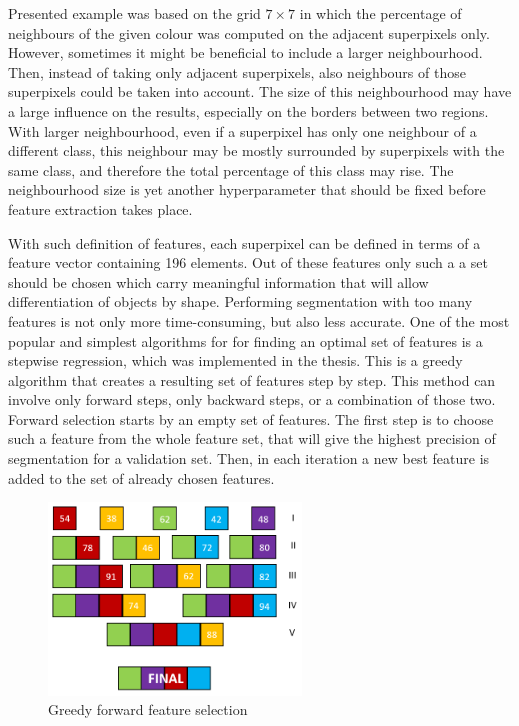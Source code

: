 Presented example was based on the grid $7 \times 7$ in which the percentage of neighbours of the given colour was computed on the adjacent superpixels only. However, sometimes it might be beneficial to include a larger neighbourhood. Then, instead of taking only adjacent superpixels, also neighbours of those superpixels could be taken into account. The size of this neighbourhood may have a large influence on the results, especially on the borders between two regions. With larger neighbourhood, even if a superpixel has only one neighbour of a different class, this neighbour may be mostly surrounded by superpixels with the same class, and therefore the total percentage of this class may rise. The neighbourhood size is yet another hyperparameter that should be fixed before feature extraction takes place.

With such definition of features, each superpixel can be defined in terms of a feature vector containing 196 elements. Out of these features only such a a set should be chosen which carry meaningful information that will allow differentiation of objects by shape. Performing segmentation with too many features is not only more time-consuming, but also less accurate. One of the most popular and simplest algorithms for for finding an optimal set of features is a stepwise regression, which was implemented in the thesis. This is a greedy algorithm that creates a resulting set of features step by step. This method can involve only forward steps, only backward steps, or a combination of those two. Forward selection starts by an empty set of features. The first step is to choose such a feature from the whole feature set, that will give the highest precision of segmentation for a validation set. Then, in each iteration a new best feature is added to the set of already chosen features. 
\begin{figure}[ht]
    \centering
    \includegraphics[width=0.60\textwidth]{images/nonlinear_intro/greedy_forward.png}
    \caption{Greedy forward feature selection}
    \label{fig:greedy_selection}
\end{figure}
